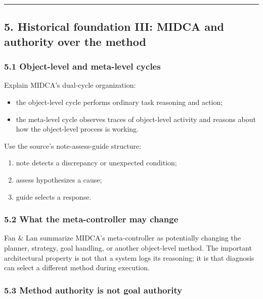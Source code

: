 \begin{center}\rule{0.5\linewidth}{0.5pt}\end{center}

\subsection{5. Historical foundation III: MIDCA and authority over the method}\label{historical-foundation-iii-midca-and-authority-over-the-method}

\subsubsection{5.1 Object-level and meta-level cycles}\label{object-level-and-meta-level-cycles}

Explain MIDCA's dual-cycle organization:

\begin{itemize}
\tightlist
\item
  the object-level cycle performs ordinary task reasoning and action;
\item
  the meta-level cycle observes traces of object-level activity and reasons about how the object-level process is working.
\end{itemize}

Use the source's note-assess-guide structure:

\begin{enumerate}
\def\labelenumi{\arabic{enumi}.}
\tightlist
\item
  note detects a discrepancy or unexpected condition;
\item
  assess hypothesizes a cause;
\item
  guide selects a response.
\end{enumerate}

\subsubsection{5.2 What the meta-controller may change}\label{what-the-meta-controller-may-change}

Fan \& Lan summarize MIDCA's meta-controller as potentially changing the planner, strategy, goal handling, or another object-level method. The important architectural property is not that a system logs its reasoning; it is that diagnosis can select a different method during execution.

\subsubsection{5.3 Method authority is not goal authority}\label{method-authority-is-not-goal-authority}

